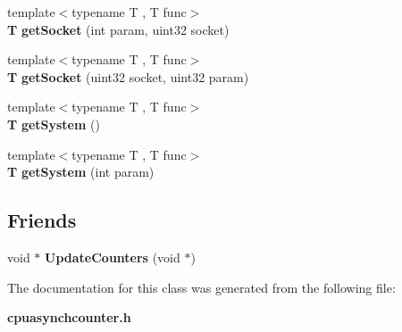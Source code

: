 \begin{DoxyCompactItemize}
\mbox{\label{classAsynchronCounterState_aba3224acb89e692bb7024c85a516b8cb}} 
{\footnotesize template$<$typename T , T  func$>$ }\\\textbf{ T} {\bfseries get\+Socket} (int param, uint32 socket)
\item 
\mbox{\label{classAsynchronCounterState_ac5441bad9ff3aaccbe5b3b8965e091d2}} 
{\footnotesize template$<$typename T , T  func$>$ }\\\textbf{ T} {\bfseries get\+Socket} (uint32 socket, uint32 param)
\item 
\mbox{\label{classAsynchronCounterState_aa474d444ebe77a8c7e94c904e87879ae}} 
{\footnotesize template$<$typename T , T  func$>$ }\\\textbf{ T} {\bfseries get\+System} ()
\item 
\mbox{\label{classAsynchronCounterState_a689f439c1e0f3b68401a0dd4341b46f0}} 
{\footnotesize template$<$typename T , T  func$>$ }\\\textbf{ T} {\bfseries get\+System} (int param)
\end{DoxyCompactItemize}
\subsection*{Friends}
\begin{DoxyCompactItemize}
\item 
\mbox{\label{classAsynchronCounterState_a972a576e955b250f38283c8c165a6c7a}} 
void $\ast$ {\bfseries Update\+Counters} (void $\ast$)
\end{DoxyCompactItemize}


The documentation for this class was generated from the following file\+:\begin{DoxyCompactItemize}
\item 
\textbf{ cpuasynchcounter.\+h}\end{DoxyCompactItemize}
